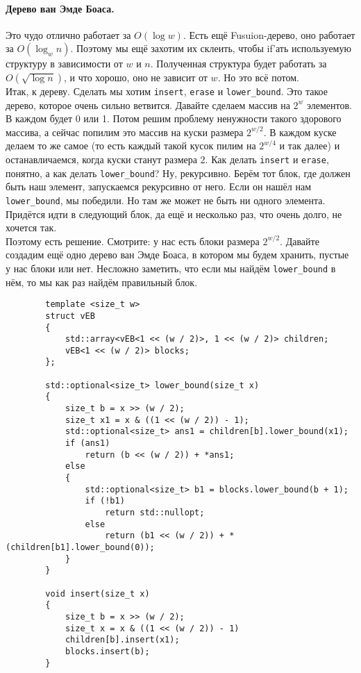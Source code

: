 \documentclass{article}
\begin{document}
    \paragraph{Дерево ван Эмде Боаса.}
    Это чудо отлично работает за $O(\log w)$. Есть ещё Fusuion-дерево, оно работает за $O(\log_wn)$. Поэтому мы ещё захотим их склеить, чтобы if'ать используемую структуру в зависимости от $w$ и $n$. Полученная структура будет работать за $O(\sqrt{\log n})$, и что хорошо, оно не зависит от $w$. Но это всё потом.\\
    Итак, к дереву. Сделать мы хотим \texttt{insert}, \texttt{erase} и \texttt{lower_bound}. Это такое дерево, которое очень сильно ветвится. Давайте сделаем массив на $2^w$ элементов. В каждом будет 0 или 1. Потом решим проблему ненужности такого здорового массива, а сейчас попилим это массив на куски размера $2^{w/2}$. В каждом куске делаем то же самое (то есть каждый такой кусок пилим на $2^{w/4}$ и так далее) и останавличаемся, когда куски станут размера 2. Как делать \texttt{insert} и \texttt{erase}, понятно, а как делать \texttt{lower_bound}? Ну, рекурсивно. Берём тот блок, где должен быть наш элемент, запускаемся рекурсивно от него. Если он нашёл нам \texttt{lower_bound}, мы победили. Но там же может не быть ни одного элемента. Придётся идти в следующий блок, да ещё и несколько раз, что очень долго, не хочется так.\\
    Поэтому есть решение. Смотрите: у нас есть блоки размера $2^{w/2}$. Давайте создадим ещё одно дерево ван Эмде Боаса, в котором мы будем хранить, пустые у нас блоки или нет. Несложно заметить, что если мы найдём \texttt{lower_bound} в нём, то мы как раз найдём правильный блок.
    \begin{verbatim}
        template <size_t w>
        struct vEB
        {
            std::array<vEB<1 << (w / 2)>, 1 << (w / 2)> children;
            vEB<1 << (w / 2)> blocks;
        };

        std::optional<size_t> lower_bound(size_t x)
        {
            size_t b = x >> (w / 2);
            size_t x1 = x & ((1 << (w / 2)) - 1);
            std::optional<size_t> ans1 = children[b].lower_bound(x1);
            if (ans1)
                return (b << (w / 2)) + *ans1;
            else
            {
                std::optional<size_t> b1 = blocks.lower_bound(b + 1);
                if (!b1)
                    return std::nullopt;
                else
                    return (b1 << (w / 2)) + *(children[b1].lower_bound(0));
            }
        }
    
        void insert(size_t x)
        {
            size_t b = x >> (w / 2);
            size_t x = x & ((1 << (w / 2)) - 1)
            children[b].insert(x1);
            blocks.insert(b);
        }
    \end{verbatim}
\end{document}
